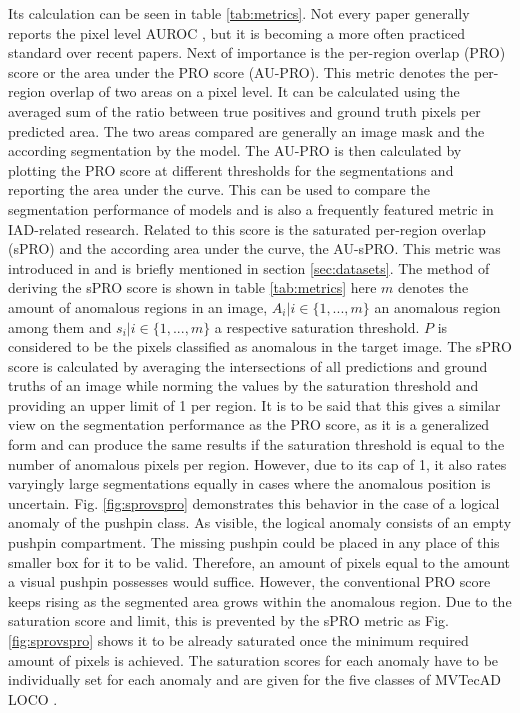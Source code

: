 

Its calculation can be seen in 
table \ref{tab:metrics}. Not every paper generally reports the pixel level AUROC \cite{csflow2022}, but it is becoming a more often 
practiced standard over recent papers.
Next of importance is the per-region overlap (PRO) score or the area under the PRO score (AU-PRO). This metric denotes the per-region overlap of two areas 
on a pixel level. It can be calculated using the averaged sum of the ratio between true positives and ground truth pixels per predicted area. The two areas 
compared are generally an image mask and the according segmentation by the model. The AU-PRO is then calculated by plotting the PRO score 
at different thresholds for the segmentations and reporting the area under the curve. This can be 
used to compare the segmentation performance of models and is also a frequently featured metric in IAD-related research. 
Related to this score is the saturated per-region overlap (sPRO) and the according area under the curve, the AU-sPRO. This metric was 
introduced in \cite{LOCODentsAndScratchesBergmann2022} and is briefly mentioned in section \ref{sec:datasets}. The method of deriving the sPRO 
score is shown in table \ref{tab:metrics} here $m$ denotes the amount of anomalous regions in an image, $A_i | i \in \{1, ... , m\}$ an anomalous 
region among them and $s_i | i \in \{1, ... , m\}$ a respective saturation threshold. $P$ is considered to be the pixels classified as anomalous 
in the target image. The sPRO score is calculated by averaging the intersections of all predictions and ground truths of an image 
while norming the values by the saturation threshold and providing an upper limit of 1 per region. It is to be said that this gives a similar 
view on the segmentation performance as the PRO score, as it is a generalized form and can produce the same results if the saturation 
threshold is equal to the number of anomalous pixels per region. However, due to its cap of 1, it also rates varyingly large segmentations equally in cases 
where the anomalous position is uncertain. Fig. \ref{fig:sprovspro} demonstrates this behavior in the case of a logical anomaly of the pushpin class. 
As visible, the logical anomaly consists of an empty pushpin compartment. The missing pushpin could be placed in any place of this smaller 
box for it to be valid. Therefore, an amount of pixels equal to the amount a visual pushpin possesses would suffice. However, the conventional PRO score 
keeps rising as the segmented area grows within the anomalous region. Due to the saturation score and limit, this is prevented 
by the sPRO metric as Fig. \ref{fig:sprovspro} shows it to be already saturated once the minimum required amount of pixels is achieved. The saturation 
scores for each anomaly have to be individually set for each anomaly and are given for the five classes of MVTecAD LOCO \cite{LOCODentsAndScratchesBergmann2022}.

